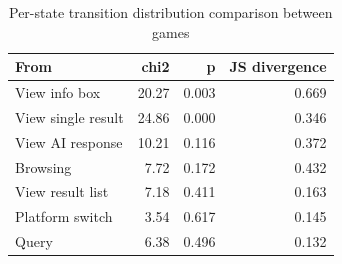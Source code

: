 \begin{table}[t]
\centering
\caption{Per-state transition distribution comparison between games}
\label{tab:rq3-transition-comparison}
\begin{tabular}{lrrr}
\toprule
From & chi2 & p & JS divergence \\
\midrule
View info box & 20.27 & 0.003 & 0.669 \\
View single result & 24.86 & 0.000 & 0.346 \\
View AI response & 10.21 & 0.116 & 0.372 \\
Browsing & 7.72 & 0.172 & 0.432 \\
View result list & 7.18 & 0.411 & 0.163 \\
Platform switch & 3.54 & 0.617 & 0.145 \\
Query & 6.38 & 0.496 & 0.132 \\
\bottomrule
\end{tabular}
\end{table}
